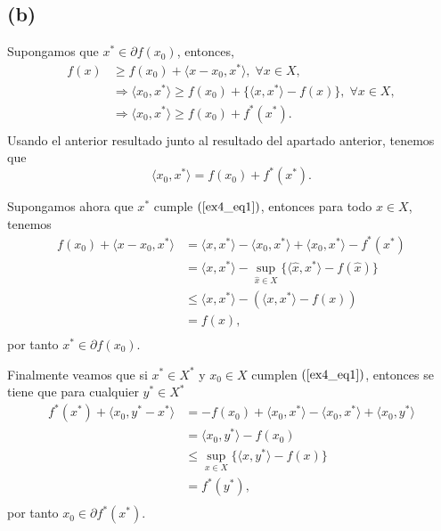 \subsection*{(b)}

Supongamos que $x^* \in \partial f(x_0)$,
entonces,
\begin{equation*}
\begin{aligned}
    f(x) & \geq f(x_0) + \langle x - x_0, x^* \rangle, \; \forall x \in X, \\
    & \Rightarrow \langle x_0, x^* \rangle \geq f(x_0) + \{ \langle x, x^* \rangle - f(x) \} , \; \forall x \in X, \\
    & \Rightarrow \langle x_0, x^* \rangle \geq f(x_0) + f^*(x^*). \\
\end{aligned} 
\end{equation*}
Usando el anterior resultado junto al resultado del apartado anterior,
tenemos que
\begin{equation*}
    \langle x_0, x^* \rangle = f(x_0) + f^*(x^*).
\end{equation*}

Supongamos ahora que $x^*$ cumple $(\ref{ex4_eq1})$,
entonces para todo $x \in X$, tenemos
\begin{equation*}
\begin{aligned}
    f(x_0) + \langle x - x_0, x^* \rangle
        & = \langle x, x^* \rangle - \langle x_0, x^* \rangle + \langle x_0, x^* \rangle - f^*(x^*) \\
        & = \langle x, x^* \rangle - \sup_{\hat{x} \in X} \{ \langle \hat{x}, x^* \rangle -f(\hat{x}) \} \\
        & \leq \langle x, x^* \rangle - (\langle x, x^* \rangle - f(x))  \\
        & = f(x),  \\
\end{aligned}
\end{equation*}
por tanto $x^* \in \partial f(x_0)$.

Finalmente veamos que si $x^* \in X^*$ y $x_0 \in X$ cumplen $(\ref{ex4_eq1})$,
entonces se tiene que para cualquier $y^* \in X^*$
\begin{equation*}
\begin{aligned}
    f^*(x^*) + \langle x_0, y^* - x^* \rangle
        & = - f(x_0) + \langle x_0, x^* \rangle - \langle x_0, x^* \rangle + \langle x_0, y^* \rangle \\
        & = \langle x_0, y^* \rangle - f(x_0) \\
        & \leq \sup_{x \in X} \{ \langle x, y^* \rangle - f(x) \} \\
        & = f^*(y^*), \\
\end{aligned}
\end{equation*}
por tanto $x_0 \in \partial f^*(x^*)$.


